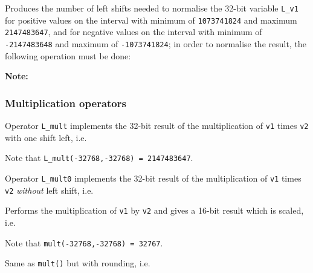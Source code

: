 
Produces the number of left shifts needed to normalise the 32-bit
variable {\tt L\_v1} for positive values on the interval with
minimum of {\tt 1073741824} and maximum {\tt 2147483647}, and for
negative values on the interval with minimum of {\tt -2147483648}
and maximum of {\tt -1073741824}; in order to normalise the
result, the following operation must be done:


\textbf{Note:} \hfill {}

\subsubsection{Multiplication operators}


Operator {\tt L\_mult} implements the 32-bit result of the
multiplication of {\tt v1} times {\tt v2} with one shift left,
i.e.


Note that {\tt L\_mult(-32768,-32768) = 2147483647}.


Operator {\tt L\_mult0} implements the 32-bit result of the
multiplication of {\tt v1} times {\tt v2} {\em without} left
shift, i.e.



Performs the multiplication of {\tt v1} by {\tt v2} and gives a 16-bit
result which is scaled, i.e.


Note that {\tt mult(-32768,-32768) = 32767}.


Same as {\tt mult()} but with rounding, i.e.

